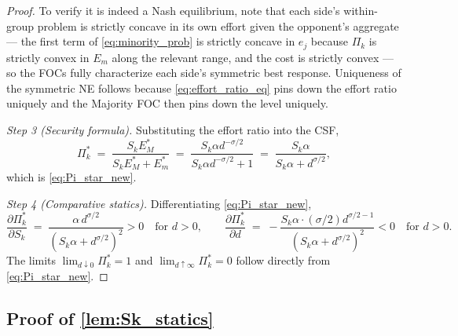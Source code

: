 \begin{proof}
To verify it is indeed a Nash equilibrium, note that each side's within-group problem is strictly concave in its own effort given the opponent's aggregate — the first term of \autoref{eq:minority_prob} is strictly concave in $e_j$ because $\Pi_k$ is strictly convex in $E_m$ along the relevant range, and the cost is strictly convex — so the FOCs fully characterize each side's symmetric best response. Uniqueness of the symmetric NE follows because \autoref{eq:effort_ratio_eq} pins down the effort ratio uniquely and the Majority FOC then pins down the level uniquely.

\textit{Step 3 (Security formula).} Substituting the effort ratio into the CSF,
\[
\Pi_k^*\;=\;\frac{S_k E_M^*}{S_k E_M^*+E_m^*}\;=\;\frac{S_k\alpha d^{-\sigma/2}}{S_k\alpha d^{-\sigma/2}+1}\;=\;\frac{S_k\alpha}{S_k\alpha+d^{\sigma/2}},
\]
which is \autoref{eq:Pi_star_new}.

\textit{Step 4 (Comparative statics).} Differentiating \autoref{eq:Pi_star_new},
\[
\frac{\partial \Pi_k^*}{\partial S_k}\;=\;\frac{\alpha\,d^{\sigma/2}}{(S_k\alpha+d^{\sigma/2})^2}>0\quad\text{for }d>0,
\qquad
\frac{\partial \Pi_k^*}{\partial d}\;=\;-\frac{S_k\alpha\cdot(\sigma/2)d^{\sigma/2-1}}{(S_k\alpha+d^{\sigma/2})^2}<0\quad\text{for }d>0.
\]
The limits $\lim_{d\downarrow 0}\Pi_k^*=1$ and $\lim_{d\uparrow\infty}\Pi_k^*=0$ follow directly from \autoref{eq:Pi_star_new}.
\end{proof}

\subsection*{Proof of \autoref{lem:Sk_statics}} \label{app:proof:Sk_statics}

